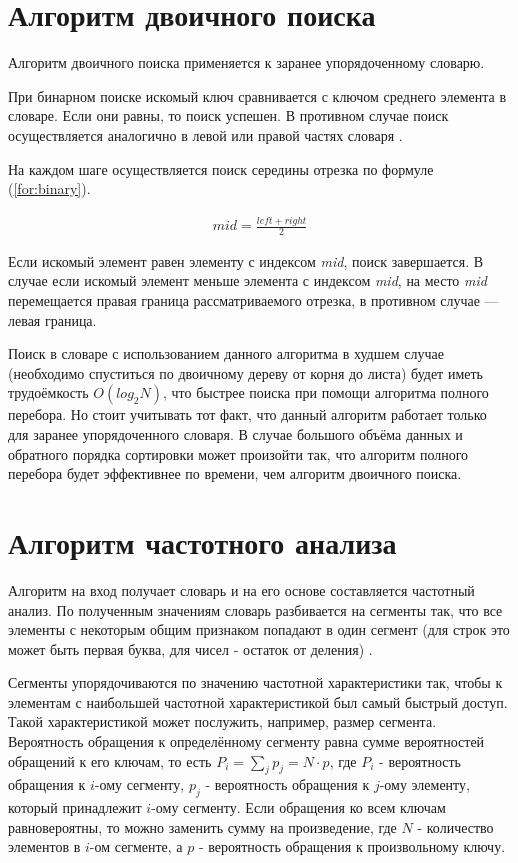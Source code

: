 \documentclass[12pt]{report}
\begin{document}
\section{Алгоритм двоичного поиска}

Алгоритм двоичного поиска применяется к заранее упорядоченному словарю. 

При бинарном поиске искомый ключ сравнивается с ключом среднего элемента в словаре. Если они равны, то поиск успешен. В противном случае поиск осуществляется аналогично в левой или правой частях словаря \cite{binary}.

На каждом шаге осуществляется поиск середины отрезка по формуле (\ref{for:binary}).

\begin{equation}
	\label{for:binary}
	\begin{aligned}
		mid = \frac{left + right}{2}
	\end{aligned}
\end{equation}

Если искомый элемент равен элементу с индексом \textit{mid}, поиск завершается. В случае если искомый элемент меньше элемента с индексом \textit{mid}, на место \textit{mid} перемещается правая граница рассматриваемого отрезка, в противном случае — левая граница.

Поиск в словаре с использованием данного алгоритма в худшем случае (необходимо спуститься по двоичному дереву от корня до листа) будет иметь трудоёмкость $O(log_2 N)$, что быстрее поиска при помощи алгоритма полного перебора. Но стоит учитывать тот факт, что данный алгоритм работает только для заранее упорядоченного словаря. В случае большого объёма данных и обратного порядка сортировки может произойти так, что алгоритм полного перебора будет эффективнее по времени, чем алгоритм двоичного поиска.

\section{Алгоритм частотного анализа}

Алгоритм на вход получает словарь и на его основе составляется частотный анализ. По полученным значениям словарь разбивается на сегменты так, что все элементы с некоторым общим признаком попадают в один сегмент (для строк это может быть первая буква, для чисел - остаток от деления) \cite{combi}. 

Сегменты упорядочиваются по значению частотной характеристики так, чтобы к элементам с наибольшей частотной характеристикой был самый быстрый доступ. Такой характеристикой может послужить, например, размер сегмента. Вероятность обращения к определённому сегменту равна сумме вероятностей обращений к его ключам, то есть $P_i = \sum_{j}p_j = N \cdot p$, где $P_i$ - вероятность обращения к $i$-ому сегменту, $p_j$ - вероятность обращения к $j$-ому элементу, который принадлежит $i$-ому сегменту. Если обращения ко всем ключам равновероятны, то можно заменить сумму на произведение, где $N$ - количество элементов в $i$-ом сегменте, а $p$ - вероятность обращения к произвольному ключу.
\end{document}
